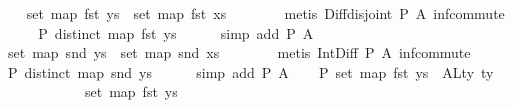 \begin{isabellebody}
\isanewline
\ \ \isamarkupfalse%
\ {\isachardoublequoteopen}set\ {\isacharparenleft}{\kern0pt}map\ fst\ ys{}{\isacharparenright}{\kern0pt}\ {\isasyminter}\ set\ {\isacharparenleft}{\kern0pt}map\ fst\ xs{\isacharparenright}{\kern0pt}\ {\isacharequal}{\kern0pt}\ {\isacharbraceleft}{\kern0pt}{\isacharbraceright}{\kern0pt}{\isachardoublequoteclose}\isanewline
\ \ \ \ \isamarkupfalse%
\ {\isacharparenleft}{\kern0pt}metis\ Diff{\isacharunderscore}{\kern0pt}disjoint\ P{}\ A{}\ inf{\isacharunderscore}{\kern0pt}commute{\isacharparenright}{\kern0pt}\isanewline
\ \ \isamarkupfalse%
\ \isamarkupfalse%
\ P{}{\isacharcolon}{\kern0pt}\ {\isachardoublequoteopen}distinct\ {\isacharparenleft}{\kern0pt}map\ fst\ ys{\isacharparenright}{\kern0pt}{\isachardoublequoteclose}\isanewline
\ \ \ \ \isamarkupfalse%
\ {\isacharparenleft}{\kern0pt}simp\ add{\isacharcolon}{\kern0pt}\ P{}\ A{}{\isacharparenright}{\kern0pt}\isanewline
\isanewline
\ \ \isamarkupfalse%
\ {\isachardoublequoteopen}set\ {\isacharparenleft}{\kern0pt}map\ snd\ ys{}{\isacharparenright}{\kern0pt}\ {\isasyminter}\ set\ {\isacharparenleft}{\kern0pt}map\ snd\ xs{\isacharparenright}{\kern0pt}\ {\isacharequal}{\kern0pt}\ {\isacharbraceleft}{\kern0pt}{\isacharbraceright}{\kern0pt}{\isachardoublequoteclose}\isanewline
\ \ \ \ \isamarkupfalse%
\ {\isacharparenleft}{\kern0pt}metis\ Int{\isacharunderscore}{\kern0pt}Diff\ P{}\ A{}\ inf{\isacharunderscore}{\kern0pt}commute{\isacharparenright}{\kern0pt}\isanewline
\ \ \isamarkupfalse%
\ \isamarkupfalse%
\ P{}{\isacharcolon}{\kern0pt}\ {\isachardoublequoteopen}distinct\ {\isacharparenleft}{\kern0pt}map\ snd\ ys{\isacharparenright}{\kern0pt}{\isachardoublequoteclose}\isanewline
\ \ \ \ \isamarkupfalse%
\ {\isacharparenleft}{\kern0pt}simp\ add{\isacharcolon}{\kern0pt}\ P{}\ A{}{\isacharparenright}{\kern0pt}\isanewline
\isanewline
\ \ \isamarkupfalse%
\ P{}{}{\isacharcolon}{\kern0pt}\ {\isachardoublequoteopen}set\ {\isacharparenleft}{\kern0pt}map\ fst\ ys{\isacharparenright}{\kern0pt}\ {\isacharequal}{\kern0pt}\ ALty\ ty{\isachardoublequoteclose}\isanewline
\ \ \ \isamarkupfalse%
\ {\isacharminus}{\kern0pt}\isanewline
\ \ \ \ \ \isamarkupfalse%
\ {\isachardoublequoteopen}set\ {\isacharparenleft}{\kern0pt}map\ fst\ ys{\isacharparenright}{\kern0pt}\ {\isacharequal}{\kern0pt}\isanewline

\end{isabellebody}
